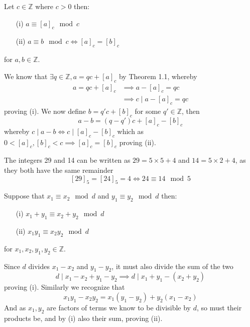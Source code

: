 \begin{prop}[Congruence]
    Let $c\in\mathbb{Z}$ where $c>0$ then:
    \begin{itemize}
        \item[(i)] $a\equiv[a]_{c}\mod c$
        \item[(ii)] $a\equiv b\mod c\iff[a]_{c}=[b]_{c}$
    \end{itemize}
    for $a,b\in\mathbb{Z}$.
\end{prop}
\begin{prf}
    We know that $\exists q\in\mathbb{Z},a=qc+[a]_{c}$ by Theorem 1.1, whereby
    \begin{align*}
        a=qc+[a]_{c}&\implies a-[a]_{c}=qc \\
                    &\implies c\mid a-[a]_{c}=qc
    \end{align*}
    proving (i). We now define $b=q'c+[b]_{c}$ for some $q'\in\mathbb{Z}$, then
    \[
        a-b=(q-q')c+[a]_{c}-[b]_{c}
    \]
    whereby $c\mid a-b\iff c\mid[a]_{c}-[b]_{c}$ which as $0<[a]_{c},[b]_{c}<c\implies[a]_{c}=[b]_{c}$ proving (ii).
\end{prf}
\begin{exmp}
  The integers 29 and 14 can be written as $29=5\times 5+4$ and $14=5\times 2+4$, as they both have the same remainder
  \[
      [29]_{5}=[24]_{5}=4\iff 24\equiv 14\mod 5
  \]
\end{exmp}
\pagebreak\begin{prop}
    Suppose that $x_{1}\equiv x_{2}\mod d$ and $y_{1}\equiv y_{2}\mod d$ then:
    \begin{itemize}
        \item[(i)] $x_{1}+y_{1}\equiv x_{2}+y_{2}\mod d$
        \item[(ii)] $x_{1}y_{1}\equiv x_{2}y_{2}\mod d$
    \end{itemize}
    for $x_{1},x_{2},y_{1},y_{2}\in\mathbb{Z}$.
\end{prop}
\begin{prf}
    Since $d$ divides $x_{1}-x_{2}$ and $y_{1}-y_{2}$, it must also divide the sum of the two
    \[
        d\mid x_{1}-x_{2}+y_{1}-y_{2}\implies d\mid x_{1}+y_{1}-(x_{2}+y_{2})
    \]
    proving (i). Similarly we recognize that
    \[
        x_{1}y_{1}-x_{2}y_{2}=x_{1}(y_{1}-y_{2})+y_{2}(x_{1}-x_{2})
    \]
    And as $x_{1},y_{2}$ are factors of terms we know to be divisible by $d$, so must their products be, and by (i) also their sum, proving (ii).
\end{prf}
